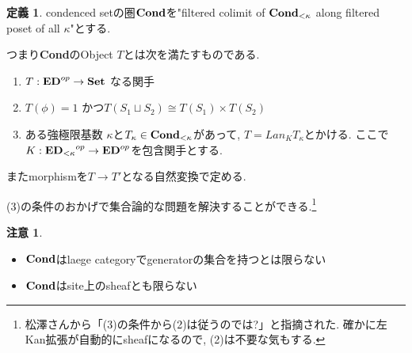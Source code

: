 \documentclass[dvipdfmx,a4paper,11pt]{report}
\theoremstyle{definition}
\newtheorem{dfn}[thm]{定義}
\newtheorem{rem}[thm]{注意}
\begin{document}
\begin{tcolorbox}
 [colback = white, colframe = green!35!black, fonttitle = \bfseries,breakable = true]
\begin{dfn}\cite[Definition 2.11]{Sch19}
\label{dfn-Sch19-Def2.11}
condenced setの圏${\bf Cond}$を"filtered colimit of ${\bf Cond_{<\kappa}}$ along filtered poset of all $\kappa$"とする.

つまり{\bf Cond}のObject $T$とは次を満たすものである.
\begin{enumerate}
\item $T : {\bf ED}^{op} \to {\bf Set}$ なる関手
\item $T(\phi)=1$ かつ$T(S_1\sqcup S_2) \cong T(S_1) \times T(S_2)$
\item ある強極限基数 $\kappa$と$T_{\kappa} \in {\bf Cond}_{<\kappa}$があって, $T = Lan_{K}T_{\kappa}$とかける. ここで$K : {{\bf ED}_{<\kappa}}^{op} \to {\bf ED}^{op}$を包含関手とする.
\end{enumerate}
またmorphismを$T \to T'$となる自然変換で定める.
\end{dfn}
 \end{tcolorbox}
 (3)の条件のおかげで集合論的な問題を解決することができる.\footnote{松澤さんから「(3)の条件から(2)は従うのでは?」と指摘された. 確かに左Kan拡張が自動的にsheafになるので, (2)は不要な気もする.}
 



\begin{rem}\cite[Remark 2.12, 2.13]{Sch19}
\begin{itemize}
\item ${\bf Cond}$はlaege categoryでgeneratorの集合を持つとは限らない
\item ${\bf Cond}$はsite上のsheafとも限らない
\end{itemize}
\end{rem}
\end{document}
